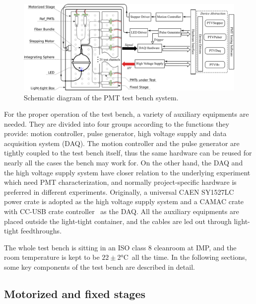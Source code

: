 \documentclass{JINST}
\begin{document}
\begin{figure}[tbp]
	\centering
	\includegraphics[width=140mm]{FIG1}
	\caption{Schematic diagram of the PMT test bench system.}
	\label{fig:FIG1}
\end{figure}

For the proper operation of the test bench, a variety of auxiliary equipments are needed. 
They are divided into four groups according to the functions they provide: motion controller, pulse generator, high voltage supply and data acquisition system (DAQ).
The motion controller and the pulse generator are tightly coupled to the test bench itself, thus the same hardware can be reused for nearly all the cases the bench may work for.
On the other hand, the DAQ and the high voltage supply system have closer relation to the underlying experiment which need PMT characterization, and normally project-specific hardware is preferred in different experiments.
Originally, a universal CAEN SY1527LC~\cite{sy1527lc} power crate is adopted as the high voltage supply system and a CAMAC crate with CC-USB crate controller~\cite{cc_usb} as the DAQ.
All the auxiliary equipments are placed outside the light-tight container, and the cables are led out through light-tight feedthroughs.
	
The whole test bench is sitting in an ISO class 8 cleanroom at IMP, and the room temperature is kept to be $22\pm2$\si{\celsius}~all the time. 
In the following sections, some key components of the test bench are described in detail.
	
\subsection{Motorized and fixed stages}
\label{sec:stages}
	
\end{document}
